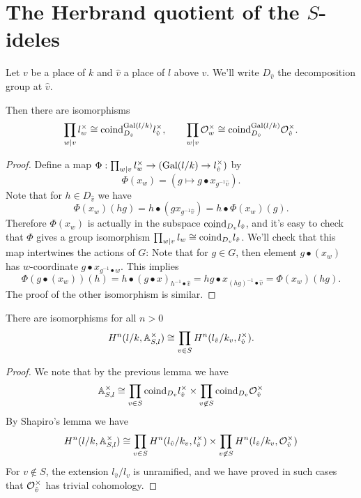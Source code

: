 \section{The Herbrand quotient of the $S$-ideles}

Let $v$ be a place of $k$ and $\hat v$ a place of $l$ above $v$.
We'll write $D_{\hat v}$ the decomposition group at $\hat v$.

\begin{lemma}
	Then there are isomorphisms
	\[
		\prod_{w | v} l_w^\times
		\cong
		\mathrm{coind}_{D_{\hat v}}^{\mathrm{Gal}(l/k)} l_{\hat v}^\times,
		\qquad
		\prod_{w | v} {\mathcal O}_w^\times
		\cong
		\mathrm{coind}_{D_{\hat v}}^{\mathrm{Gal}(l/k)} {\mathcal O}_{\hat v}^\times.
	\]
\end{lemma}

\begin{proof}
	Define a map $\Phi : \prod_{w | v} l_w^\times \to (\mathrm{Gal}(l/k) \to l_{\hat v}^\times)$ by
	\[
		\Phi ( x_w)
		=
		(g \mapsto g \bullet x_{g^{-1} \hat v}).
	\]
	Note that for $h \in D_{\hat v}$ we have
	\[
		\Phi (x_w) (hg) = h \bullet (g  x_{g^{-1} \hat v}) = h \bullet \Phi(x_w) (g).
	\]
	Therefore $\Phi(x_w)$ is actually in the subspace $\mathrm{coind}_{D_v} l_{\hat v}$, and it's
	easy to check that $\Phi$ gives a group isomorphism
	$\prod_{w | v} l_w \cong \mathrm{coind}_{D_v} l_{\hat v}$.
	We'll check that this map intertwines the actions of $G$:
	Note that for $g \in G$, then element $g \bullet (x_w)$ has $w$-coordinate
	$g \bullet x_{g^{-1}\bullet w}$.
	This implies
	\[
		\Phi( g \bullet (x_w))(h)
		=	h\bullet (g \bullet x)_{h^{-1} \bullet \hat v}
		=	h g \bullet x_{(hg)^{-1} \bullet \hat v}
		= \Phi (x_w) (hg).
	\]
	The proof of the other isomorphism is similar.
\end{proof}

\begin{lemma}
	There are isomorphisms for all $n > 0$
	\[
		H^n(l/k, {\mathbb A}_{S,l}^\times)
		\cong
		\prod_{v \in S} H^n(l_{\hat v} / k_v, l_{\hat v}^\times).
	\]
\end{lemma}

\begin{proof}
	We note that by the previous lemma we have
	\[
		{\mathbb A}_{S,l}^\times \cong \prod_{v \in S} \mathrm{coind}_{D_{\hat v}} l_{\hat v}^\times
		\times
		\prod_{v \not\in S} \mathrm{coind}_{D_{\hat v}} {\mathcal O}_{\hat v}^\times
	\]
	By Shapiro's lemma we have
	\[
		H^n(l/k,{\mathbb A}_{S,l}^\times) \cong
		\prod_{v \in S} H^n(l_{\hat v}/k_v , l_{\hat v}^\times)
		\times
		\prod_{v \not\in S} H^n(l_{\hat v}/k_v , {\mathcal O}_{\hat v}^\times)
	\]
	For $v \not\in S$, the extension $l_{\hat{v}}/l_v$ is unramified, and
	we have proved in such cases that ${\mathcal O}_{\hat v}^\times$ has trivial cohomology.
\end{proof}


